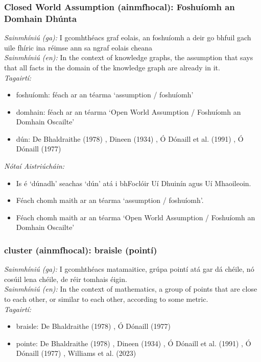 \subsubsection*{Closed World Assumption (ainmfhocal): Foshuíomh an Domhain Dhúnta}
 \noindent \textit{Sainmhíniú (ga):} I gcomhthéacs graf eolais, an foshuíomh a deir go bhfuil gach uile fhíric ina réimse ann sa ngraf eolais cheana
\\
 \noindent \textit{Sainmhíniú (en):} In the context of knowledge graphs, the assumption that says that all facts in the domain of the knowledge graph are already in it.
\\
 \noindent \textit{Tagairtí:}
\begin{itemize}
	\item foshuíomh: féach ar an téarma `assumption / foshuíomh'
	\item domhain: féach ar an téarma `Open World Assumption / Foshuíomh an Domhain Oscailte'
	\item dún: De Bhaldraithe (1978) \cite{de-bhaldraithe}, Dineen (1934) \cite{dineen}, Ó Dónaill et al. (1991) \cite{focloir-beag}, Ó Dónaill (1977) \cite{odonaill}
\end{itemize}

 \noindent \textit{Nótaí Aistriúcháin:}
\begin{itemize}
	\item Is é `dúnadh' seachas `dún' atá i bhFoclóir Uí Dhuinín agus Uí Mhaoileoin.
	\item Féach chomh maith ar an téarma `assumption / foshuíomh'.
	\item Féach chomh maith ar an téarma `Open World Assumption / Foshuíomh an Domhain Oscailte'
\end{itemize}


\subsubsection*{cluster (ainmfhocal): braisle (pointí)}
 \noindent \textit{Sainmhíniú (ga):} I gcomhthéacs matamaitice, grúpa pointí atá gar dá chéile, nó cosúil lena chéile, de réir tomhais éigin.
\\
 \noindent \textit{Sainmhíniú (en):} In the context of mathematics, a group of points that are close to each other, or similar to each other, according to some metric.
\\
 \noindent \textit{Tagairtí:}
\begin{itemize}
	\item braisle: De Bhaldraithe (1978) \cite{de-bhaldraithe}, Ó Dónaill (1977) \cite{odonaill}
	\item pointe: De Bhaldraithe (1978) \cite{de-bhaldraithe}, Dineen (1934) \cite{dineen}, Ó Dónaill et al. (1991) \cite{focloir-beag}, Ó Dónaill (1977) \cite{odonaill}, Williams et al. (2023) \cite{storchiste}
\end{itemize}

